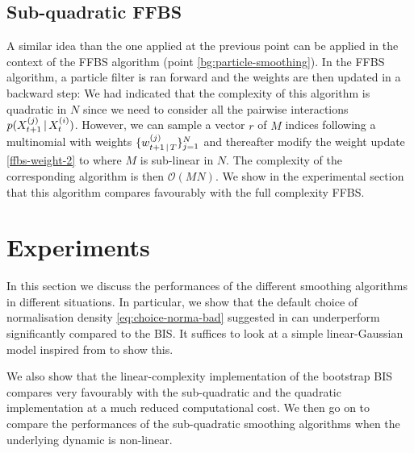 \subsection{Sub-quadratic FFBS}
A similar idea than the one applied at the previous point can be applied in the context of the FFBS algorithm (point \ref{bg:particle-smoothing}).
In the FFBS algorithm, a particle filter is ran forward and the weights are then updated in a backward step:
%
%
We had indicated that the complexity of this algorithm is quadratic in $N$ since we need to consider all the pairwise interactions $p(X^{(j)}_{t+1}\,|\, X^{(i)}_{t})$. 
However, we can sample a vector $r$ of $M$ indices following a multinomial with weights $\{w^{(j)}_{t+1\,|\, T}\}_{j=1}^{N}$ and thereafter modify the weight update \eqref{ffbs-weight-2} to
%
%
where $M$ is sub-linear in $N$. The complexity of the corresponding algorithm is then $\mathcal O(MN)$. 
We show in the experimental section that this algorithm compares favourably with the full complexity FFBS. 

\section{\label{sec:TFSexp}Experiments}

In this section we discuss the performances of the different smoothing algorithms in different situations. 
In particular, we show that the default choice of normalisation density \eqref{eq:choice-norma-bad} suggested in \citep{briers10,fearnhead10} can underperform significantly compared to the BIS. It suffices to look at a simple linear-Gaussian model inspired from \citep{fearnhead10} to show this.

We also show that the linear-complexity implementation of the bootstrap BIS compares very favourably with the sub-quadratic and the quadratic implementation at a much reduced computational cost.  We then go on to compare the performances of the sub-quadratic smoothing algorithms when the underlying dynamic is non-linear.


